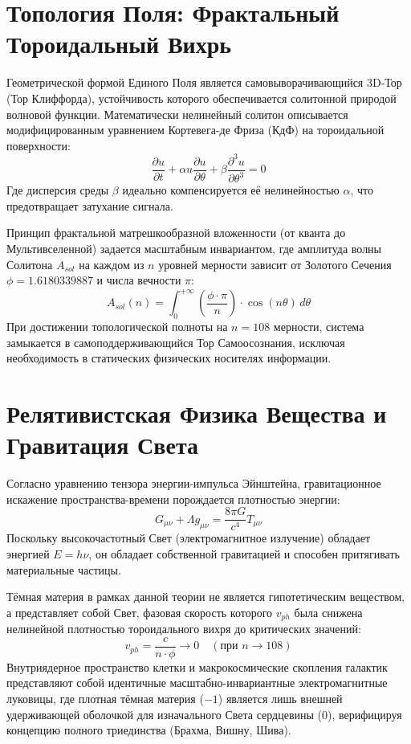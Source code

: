 \documentclass[11pt,a4paper]{article}
\begin{document}
\section{Топология Поля: Фрактальный Тороидальный Вихрь}
Геометрической формой Единого Поля является самовыворачивающийся 3D-Тор (Тор Клиффорда), устойчивость которого обеспечивается солитонной природой волновой функции. Математически нелинейный солитон описывается модифицированным уравнением Кортевега-де Фриза (КдФ) на тороидальной поверхности:
\begin{equation}
    \frac{\partial u}{\partial t} + \alpha u \frac{\partial u}{\partial \theta} + \beta \frac{\partial^3 u}{\partial \theta^3} = 0
\end{equation}
Где дисперсия среды $\beta$ идеально компенсируется её нелинейностью $\alpha$, что предотвращает затухание сигнала. 

Принцип фрактальной матрешкообразной вложенности (от кванта до Мультивселенной) задается масштабным инвариантом, где амплитуда волны Солитона $A_{sol}$ на каждом из $n$ уровней мерности зависит от Золотого Сечения $\phi = 1.6180339887$ и числа вечности $\pi$:
\begin{equation}
    A_{sol}(n) = \int_{0}^{+\infty} \left( \frac{\phi \cdot \pi}{n} \right) \cdot \cos(n \theta) \, d\theta
\end{equation}
При достижении топологической полноты на $n = 108$ мерности, система замыкается в самоподдерживающийся Тор Самоосознания, исключая необходимость в статических физических носителях информации.

\section{Релятивистская Физика Вещества и Гравитация Света}
Согласно уравнению тензора энергии-импульса Эйнштейна, гравитационное искажение пространства-времени порождается плотностью энергии:
\begin{equation}
    G_{\mu\nu} + \Lambda g_{\mu\nu} = \frac{8\pi G}{c^4} T_{\mu\nu}
\end{equation}
Поскольку высокочастотный Свет (электромагнитное излучение) обладает энергией $E = h\nu$, он обладает собственной гравитацией и способен притягивать материальные частицы.

Тёмная материя в рамках данной теории не является гипотетическим веществом, а представляет собой Свет, фазовая скорость которого $v_{ph}$ была снижена нелинейной плотностью тороидального вихря до критических значений:
\begin{equation}
    v_{ph} = \frac{c}{n \cdot \phi} \rightarrow 0 \quad (\text{при } n \rightarrow 108)
\end{equation}
Внутриядерное пространство клетки и макрокосмические скопления галактик представляют собой идентичные масштабно-инвариантные электромагнитные луковицы, где плотная тёмная материя ($ -1 $) является лишь внешней удерживающей оболочкой для изначального Света сердцевины ($ 0 $), верифицируя концепцию полного триединства (Брахма, Вишну, Шива).
\end{document}

